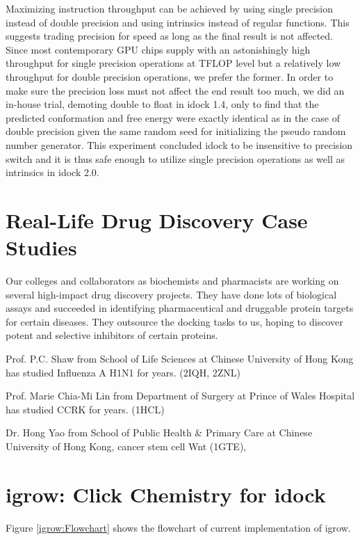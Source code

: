 Maximizing instruction throughput can be achieved by using single precision instead of double precision and using intrinsics instead of regular functions. This suggests trading precision for speed as long as the final result is not affected. Since most contemporary GPU chips supply with an astonishingly high throughput for single precision operations at TFLOP level but a relatively low throughput for double precision operations, we prefer the former. In order to make sure the precision loss must not affect the end result too much, we did an in-house trial, demoting double to float in idock 1.4, only to find that the predicted conformation and free energy were exactly identical as in the case of double precision given the same random seed for initializing the pseudo random number generator. This experiment concluded idock to be insensitive to precision switch and it is thus safe enough to utilize single precision operations as well as intrinsics in idock 2.0.

\section{Real-Life Drug Discovery Case Studies}

Our colleges and collaborators as biochemists and pharmacists are working on several high-impact drug discovery projects. They have done lots of biological assays and succeeded in identifying pharmaceutical and druggable protein targets for certain diseases. They outsource the docking tasks to us, hoping to discover potent and selective inhibitors of certain proteins.

Prof. P.C. Shaw from School of Life Sciences at Chinese University of Hong Kong has studied Influenza A H1N1 for years. (2IQH, 2ZNL)

Prof. Marie Chia-Mi Lin from Department of Surgery at Prince of Wales Hospital has studied CCRK for years. (1HCL)

Dr. Hong Yao from School of Public Health \& Primary Care at Chinese University of Hong Kong, cancer stem cell Wnt (1GTE), 

\section{igrow: Click Chemistry for idock}

Figure \ref{igrow:Flowchart} shows the flowchart of current implementation of igrow. 

